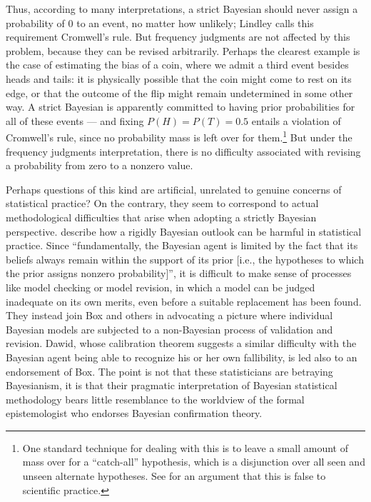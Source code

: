 \documentclass[letterpaper,12pt]{article}
\begin{document}
Thus, according to many interpretations, a strict Bayesian should never assign a probability of $0$ to an event, no matter how unlikely; Lindley calls this requirement Cromwell's rule. But frequency judgments are not affected by this problem, because they can be revised arbitrarily. Perhaps the clearest example is the case of estimating the bias of a coin, where we admit a third event besides heads and tails: it is physically possible that the coin might come to rest on its edge, or that the outcome of the flip might remain undetermined in some other way. A strict Bayesian is apparently committed to having prior probabilities for all of these events --- and fixing $P(H) = P(T) = 0.5$ entails a violation of Cromwell's rule, since no probability mass is left over for them.\footnote{One standard technique for dealing with this is to leave a small amount of mass over for a ``catch-all'' hypothesis, which is a disjunction over all seen and unseen alternate hypotheses. See \cite{fitelson2008bayesians} for an argument that this is false to scientific practice.} But under the frequency judgments interpretation, there is no difficulty associated with revising a probability from zero to a nonzero value.

Perhaps questions of this kind are artificial, unrelated to genuine concerns of statistical practice? On the contrary, they seem to correspond to actual methodological difficulties that arise when adopting a strictly Bayesian perspective. \cite{Gelman2012-GELPAT} describe how a rigidly Bayesian outlook can be harmful in statistical practice. Since ``fundamentally, the Bayesian agent is limited by the fact that its beliefs always remain within the support of its prior [i.e., the hypotheses to which the prior assigns nonzero probability]'', it is difficult to make sense of processes like model checking or model revision, in which a model can be judged inadequate on its own merits, even before a suitable replacement has been found. They instead join Box and others in advocating a picture where individual Bayesian models are subjected to a non-Bayesian process of validation and revision. Dawid, whose calibration theorem suggests a similar difficulty with the Bayesian agent being able to recognize his or her own fallibility, is led also to an endorsement of Box. The point is not that these statisticians are betraying Bayesianism, it is that their pragmatic interpretation of Bayesian statistical methodology bears little resemblance to the worldview of the formal epistemologist who endorses Bayesian confirmation theory.
\end{document}

